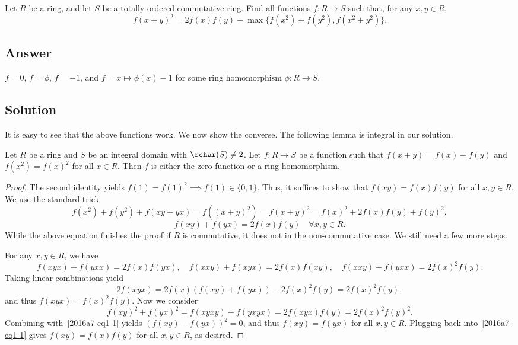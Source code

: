 Let $R$ be a ring, and let $S$ be a totally ordered commutative ring.
Find all functions $f : R \to S$ such that, for any $x, y \in R$,
\[ f(x + y)^2 = 2 f(x) f(y) + \max\{f(x^2) + f(y^2), f(x^2 + y^2)\}. \tag{*}\label{2016a7-eq0} \]





\subsection*{Answer}

$f = 0$, $f = \phi$, $f = -1$, and $f = x \mapsto \phi(x) - 1$ for some ring homomorphism $\phi : R \to S$.





\subsection*{Solution}

It is easy to see that the above functions work.
We now show the converse.
The following lemma is integral in our solution.

\begin{lemma}\label{2016a7-1}
Let $R$ be a ring and $S$ be an integral domain with $\rchar(S) \neq 2$.
Let $f : R \to S$ be a function such that $f(x + y) = f(x) + f(y)$ and $f(x^2) = f(x)^2$ for all $x \in R$.
Then $f$ is either the zero function or a ring homomorphism.
\end{lemma}
\begin{proof}
The second identity yields $f(1) = f(1)^2 \implies f(1) \in \{0, 1\}$.
Thus, it suffices to show that $f(xy) = f(x) f(y)$ for all $x, y \in R$.
We use the standard trick
\[ f(x^2) + f(y^2) + f(xy + yx) = f((x + y)^2) = f(x + y)^2 = f(x)^2 + 2 f(x) f(y) + f(y)^2, \]
\[ f(xy) + f(yx) = 2 f(x) f(y) \quad \forall x, y \in R. \tag{1-1}\label{2016a7-eq1-1} \]
While the above equation finishes the proof if $R$ is commutative, it does not in the non-commutative case.
We still need a few more steps.

For any $x, y \in R$, we have
\[ f(xyx) + f(yxx) = 2 f(x) f(yx), \quad f(xxy) + f(xyx) = 2 f(x) f(xy), \quad f(xxy) + f(yxx) = 2 f(x)^2 f(y). \]
Taking linear combinations yield
\[ 2 f(xyx) = 2 f(x) (f(xy) + f(yx)) - 2 f(x)^2 f(y) = 2 f(x)^2 f(y), \]
    and thus $f(xyx) = f(x)^2 f(y)$.
Now we consider
\[ f(xy)^2 + f(yx)^2 = f(xyxy) + f(yxyx) = 2 f(xyx) f(y) = 2 f(x)^2 f(y)^2. \]
Combining with~\eqref{2016a7-eq1-1} yields $(f(xy) - f(yx))^2 = 0$, and thus $f(xy) = f(yx)$ for all $x, y \in R$.
Plugging back into~\eqref{2016a7-eq1-1} gives $f(xy) = f(x) f(y)$ for all $x, y \in R$, as desired.
\end{proof}

